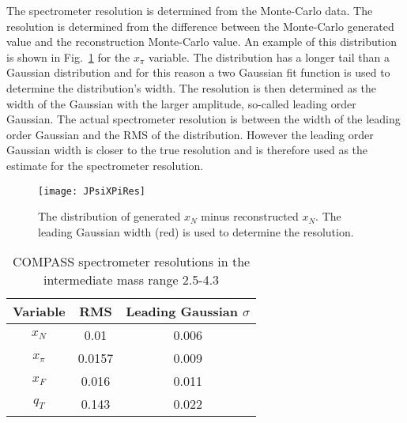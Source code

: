 The spectrometer resolution is determined from the Monte-Carlo data.  The
resolution is determined from the difference between the Monte-Carlo generated
value and the reconstruction Monte-Carlo value.  An example of this distribution
is shown in Fig.~\ref{fig::JPsiXPiRes} for the $x_\pi$ variable.  The
distribution has a longer tail than a Gaussian distribution and for this reason
a two Gaussian fit function is used to determine the distribution's width.  The
resolution is then determined as the width of the Gaussian with the larger
amplitude, so-called leading order Gaussian.  The actual spectrometer resolution
is between the width of the leading order Gaussian and the RMS of the
distribution.  However the leading order Gaussian width is closer to the true
resolution and is therefore used as the estimate for the spectrometer
resolution.

\begin{figure}[h!t]
  \centering
  \texttt{[image: JPsiXPiRes]}
  \caption{The distribution of generated $x_N$ minus reconstructed $x_N$.  The
    leading Gaussian width (red) is used to determine the resolution.}
  \label{fig::JPsiXPiRes}
\end{figure}

\begin{table}[h!t]
  \centering
  \begin{tabular}{ |c|c|c| }
    \hline \textbf{Variable}& \textbf{RMS}& \textbf{Leading Gaussian $\sigma$}
    \\ \hline \hline
    
    $x_N$& 0.01& 0.006 \\ \hline

    $x_\pi$& 0.0157& 0.009 \\ \hline

    $x_F$& 0.016& 0.011 \\ \hline

    $q_T$& 0.143& 0.022 \\ \hline
  \end{tabular}
  \caption{COMPASS spectrometer resolutions in the intermediate mass range
    2.5-4.3{\gvcw}}
  \label{tab::JPsiRes}
\end{table}


